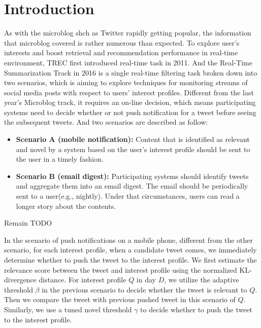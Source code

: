 \section{Introduction}
As with the microblog shch as Twitter rapidly getting popular, the information that microblog covered is rather numerous than expected. To explore user's interests and boost retrieval and recommendation performance in real-time environment, TREC first introduced real-time task in 2011. And the Real-Time Summarization Track in 2016 is a single real-time filtering task broken down into two scenarios, which is aiming to explore techniques for monitoring streams of social media posts with respect to users' interest profiles. Different from the last year's Microblog track, it requires an on-line decision, which means participating systems need to decide whether or not push notification for a tweet before seeing the subsequent tweets. And two scenarios are described as follow:

\begin{itemize}
\item \textbf{Scenario A (mobile notification):} Content that is identified as relevant and novel by a system based on the user's interest profile should be sent to the user in a timely fashion. 
\item \textbf{Scenario B (email digest):} Participating systems should identify tweets and aggregate them into an email digest. The email should be periodically sent to a user(e.g., nightly). Under that circumstances, users can read a longer story about the contents.
\end{itemize}


Remain TODO


In the scenario of push notifications on a mobile phone, different from the other scenario, for each interest profile, when a candidate tweet comes, we immediately determine whether to push the tweet to the interest profile. We first estimate the relevance score between the tweet and interest profile using the normalized KL-divergence distance. For interest profile $Q$ in day $D$, we utilize the adaptive threshold $\beta$ in the previous scenario to decide whether the tweet is relevant to $Q$. Then we compare the tweet with previous pushed tweet in this scenario of $Q$. Similarly, we use a tuned novel threshold $\gamma$ to decide whether to push the tweet to the interest profile.


